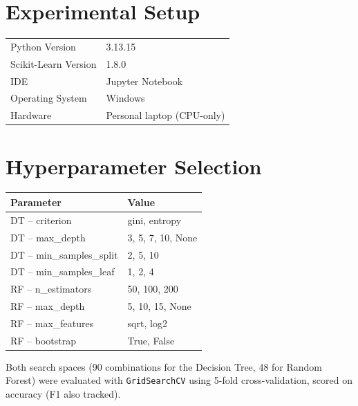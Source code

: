 \documentclass[12pt,a4paper]{article}
\begin{document}
\section{Experimental Setup}
\begin{tabular}{ll}
\toprule
Python Version & 3.13.15 \\
Scikit-Learn Version & 1.8.0 \\
IDE & Jupyter Notebook \\
Operating System & Windows \\
Hardware & Personal laptop (CPU-only) \\
\bottomrule
\end{tabular}

\section{Hyperparameter Selection}

\begin{tabular}{ll}
\toprule
Parameter & Value\\
\midrule
DT -- criterion & gini, entropy \\
DT -- max\_depth & 3, 5, 7, 10, None \\
DT -- min\_samples\_split & 2, 5, 10 \\
DT -- min\_samples\_leaf & 1, 2, 4 \\
RF -- n\_estimators & 50, 100, 200 \\
RF -- max\_depth & 5, 10, 15, None \\
RF -- max\_features & sqrt, log2 \\
RF -- bootstrap & True, False \\
\bottomrule
\end{tabular}

\noindent Both search spaces (90 combinations for the Decision Tree, 48 for Random Forest) were
evaluated with \texttt{GridSearchCV} using 5-fold cross-validation, scored on accuracy (F1 also
tracked).
\end{document}
